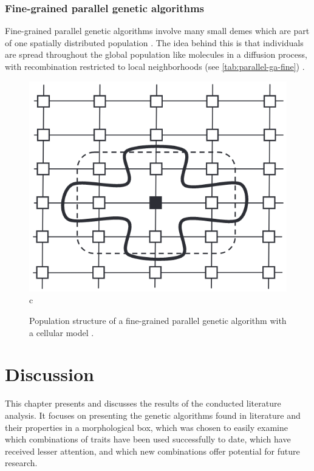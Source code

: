 \documentclass[sigconf]{acmart}
\begin{document}
\subsubsection*{Fine-grained parallel genetic algorithms}
Fine-grained parallel genetic algorithms involve many small demes which are
part of one spatially distributed population \cite{Affenzeller2009}.
The idea behind this is that individuals are spread throughout the
global population like molecules in a diffusion process, with recombination
restricted to local neighborhoods (see \autoref{tab:parallel-ga-fine})
\cite{Affenzeller2009}.
\begin{figure}[h]
  \includegraphics[scale=0.24]{assets/parallel-ga-fine.png}c
  \caption{
    Population structure of a fine-grained parallel genetic algorithm
    with a cellular model \cite{Affenzeller2009}.
  }
  \label{tab:parallel-ga-fine}
\end{figure}


\newpage
\section{Discussion}
This chapter presents and discusses the results of the conducted literature
analysis. It focuses on presenting the genetic algorithms found in literature
and their properties in a morphological box, which was chosen to easily
examine which combinations of traits have been used successfully to date,
which have received lesser attention, and which new combinations offer potential
for future research.
\end{document}

